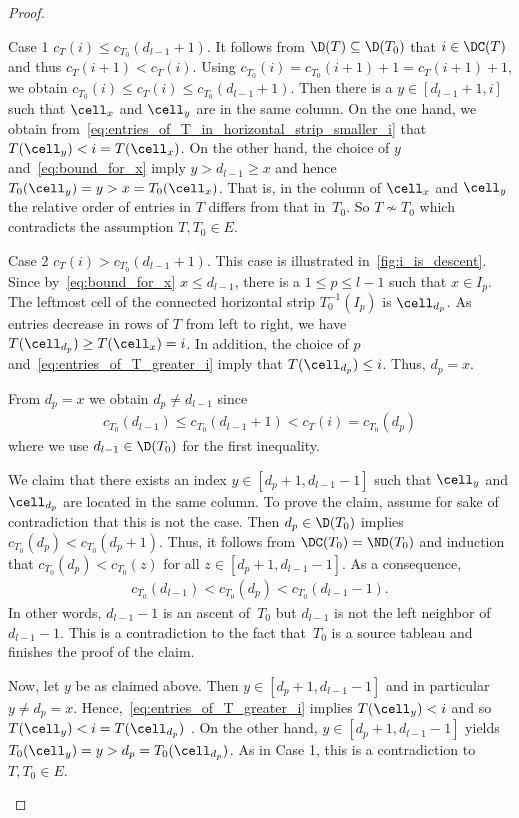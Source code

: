 \begin{proof}
\begin{enonce*}[remark]{Case 1} 
$c_T(i) \leq c_{T_0}(d_{l-1}+1)$. It follows from $\D(T) \subseteq \D(T_0)$ that $i\in \DC(T)$ and thus $c_T(i+1) < c_T(i) $. 
	Using $c_{T_0}(i) = c_{T_0}(i+1) + 1 = c_{T}(i+1) + 1$, we obtain
	$c_{T_0}(i) \leq c_T(i) \leq c_{T_0}(d_{l-1}+1).$
	Then there is a $y\in [d_{l-1}+1, i]$ such that $\cell_x$ and $\cell_y$ are in the same column. 
	On the one hand, we obtain from~\eqref{eq:entries_of_T_in_horizontal_strip_smaller_i} that $T(\cell_y) < i = T(\cell_x)$. 
	On the other hand, the choice of $y$ and~\eqref{eq:bound_for_x} imply $y>d_{l-1} \geq x$ and hence $T_0(\cell_y) =y> x = T_0(\cell_x)$.	
	That is, in the column of $\cell_x$ and $\cell_y$ the relative order of entries in $T$ differs from that in~$T_0$.
	So $T\not \sim T_0$ which contradicts the assumption $T,T_0 \in E$.
	\end{enonce*}
\begin{enonce*}[remark]{Case 2} 
	$c_T(i) > c_{T_0}(d_{l-1}+1)$. This case is illustrated in~\cref{fig:i_is_descent}. Since by~\eqref{eq:bound_for_x} $x\leq d_{l-1}$, there is a $1\leq p\leq l-1$ such that $x\in I_p$.
	The leftmost cell of the connected horizontal strip $T^{-1}_0(I_p)$ is $\cell_{d_p}$. As entries decrease in rows of $T$ from left to right, we have $T(\cell_{d_p})\geq T(\cell_x) = i$. In addition, the choice of $p$ and~\eqref{eq:entries_of_T_greater_i} imply that $T(\cell_{d_p})\leq i$. Thus, $d_p=x$.
	
	From $d_p=x$ we obtain $d_p \neq d_{l-1}$ since
	\begin{align*}
	c_{T_0}(d_{l-1}) \leq c_{T_0}(d_{l-1}+1) < c_T(i) = c_{T_0}(d_p)
	\end{align*}
	where we use $d_{l-1}\in \D(T_0)$ for the first inequality.
	
	We claim that there exists an index $y\in [d_p +1, d_{l-1} -1]$ such that $\cell_y$ and $\cell_{d_p}$ are located in the same column.
	To prove the claim, assume for sake of contradiction that this is not the case. Then $d_p \in \D(T_0)$ implies $ c_{T_0}(d_p)< c_{T_0}(d_p+1)$. Thus, it follows from $\DC(T_0)= \ND(T_0)$ and induction that $c_{T_0}(d_p)< c_{T_0}(z)$ for all ${z\in[d_p+1,d_{l-1} -1]}$. As a consequence,
		\begin{align*}
		c_{T_0}(d_{l-1}) < c_{T_0}(d_p) < c_{T_0}(d_{l-1}-1).
		\end{align*}
		In other words, $d_{l-1}-1$ is an ascent of~$T_0$
		but $d_{l-1}$ is not the left neighbor of $d_{l-1}-1$.	
		 This is a contradiction to the fact that~$T_0$ is a source tableau and finishes the proof of the claim.
	
	Now, let $y$ be as claimed above. Then $y\in [d_p +1, d_{l-1} -1]$ and in particular $y\neq d_p= x$. Hence,~\eqref{eq:entries_of_T_greater_i} implies $T(\cell_y) <i$ and so $T(\cell_y) < i = T(\cell_{d_p})$ . 
 On the other hand, $y\in [d_p +1, d_{l-1} -1]$ yields $T_0(\cell_y) =y > d_p = T_0(\cell_{d_p})$. As in Case 1, this is a contradiction to $T,T_0\in E$.\qedhere
\end{enonce*}
\end{proof}


